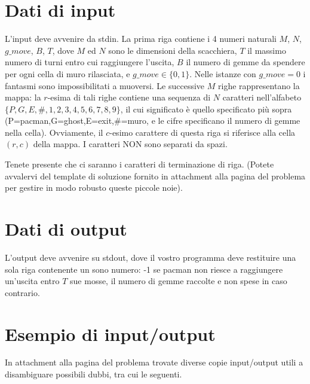 \section*{Dati di input}

L'input deve avvenire da stdin.
La prima riga contiene i 4 numeri naturali $M$, $N$, $g\_move$, $B$, $T$,
dove $M$ ed $N$ sono le dimensioni della scacchiera, $T$ il massimo numero di turni entro cui raggiungere l'uscita, $B$ il numero di gemme da spendere per ogni cella di muro rilasciata, e $g\_move \in \{0,1\}$.
Nelle istanze con $g\_move = 0$ i fantasmi sono impossibilitati a muoversi.
Le successive $M$ righe rappresentano la mappa: la $r$-esima di tali righe contiene una
sequenza di $N$ caratteri nell'alfabeto $\{P,G,E,\#,1,2,3,4,5,6,7,8,9\}$, il cui significato è quello specificato più sopra (P=pacman,G=ghost,E=exit,\#=muro, e le cifre specificano il numero di gemme nella cella).
Ovviamente, il $c$-esimo carattere di questa riga si riferisce alla cella $(r, c)$ della mappa. I caratteri NON sono separati da spazi.

Tenete presente che ci saranno i caratteri di terminazione di riga. (Potete avvalervi del template di soluzione fornito in attachment alla pagina del problema per gestire in modo robusto queste piccole noie). 

\section*{Dati di output}

L'output deve avvenire su stdout, dove il vostro programma deve restituire una sola riga contenente un sono numero: -1 se pacman non riesce a raggiungere un'uscita entro $T$ sue mosse, il numero di gemme raccolte e non spese in caso contrario.


\section*{Esempio di input/output}

In attachment alla pagina del problema trovate diverse copie input/output utili a disambiguare possibili dubbi, tra cui le seguenti.

\vspace{0.5cm}



